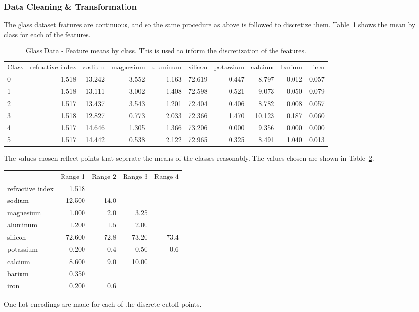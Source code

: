 \documentclass{amsart}
\begin{document}
\subsubsection*{Data Cleaning \& Transformation}
The glass dataset\cite{glassdataset} features are continuous, and so the same procedure as above is followed to discretize them.
Table~\ref{glassmeans} shows the mean by class for each of the features.
\begin{table}
\begin{tabular}{lrrrrrrrrr}
Class &  refractive index &     sodium &  magnesium &  aluminum &    silicon &  potassium &    calcium &    barium &      iron \\
0 &          1.518 &  13.242 &   3.552 &  1.163 &  72.619 &   0.447 &   8.797 &  0.012 &  0.057 \\
1 &          1.518 &  13.111 &   3.002 &  1.408 &  72.598 &   0.521 &   9.073 &  0.050 &  0.079 \\
2 &          1.517 &  13.437 &   3.543 &  1.201 &  72.404 &   0.406 &   8.782 &  0.008 &  0.057 \\
3 &          1.518 &  12.827 &   0.773 &  2.033 &  72.366 &   1.470 &  10.123 &  0.187 &  0.060 \\
4 &          1.517 &  14.646 &   1.305 &  1.366 &  73.206 &   0.000 &   9.356 &  0.000 &  0.000 \\
5 &          1.517 &  14.442 &   0.538 &  2.122 &  72.965 &   0.325 &   8.491 &  1.040 &  0.013
\end{tabular}
\caption{Glass Data - Feature means by class. This is used to inform the discretization of the features.}
\label{glassmeans}
\end{table}
The values chosen reflect points that seperate the means of the classes reasonably. The values chosen are shown in Table~\ref{glass_discrete}.
\begin{table}
\begin{tabular}{lrrrr}
{} &       Range 1 &     Range 2 &      Range 3 &     Range 4 \\
refractive index &   1.518 &   {} &    {} &   {} \\
sodium           &  12.500 &  14.0 &    {} &   {} \\
magnesium        &   1.000 &   2.0 &   3.25 &   {} \\
aluminum         &   1.200 &   1.5 &   2.00 &   {} \\
silicon          &  72.600 &  72.8 &  73.20 &  73.4 \\
potassium        &   0.200 &   0.4 &   0.50 &   0.6 \\
calcium          &   8.600 &   9.0 &  10.00 &   {} \\
barium           &   0.350 &   {} &    {} &   {} \\
iron             &   0.200 &   0.6 &    {} &   {} \\
\end{tabular}
\label{glass_discrete}
\end{table}
One-hot encodings are made for each of the discrete cutoff points.
\end{document}
